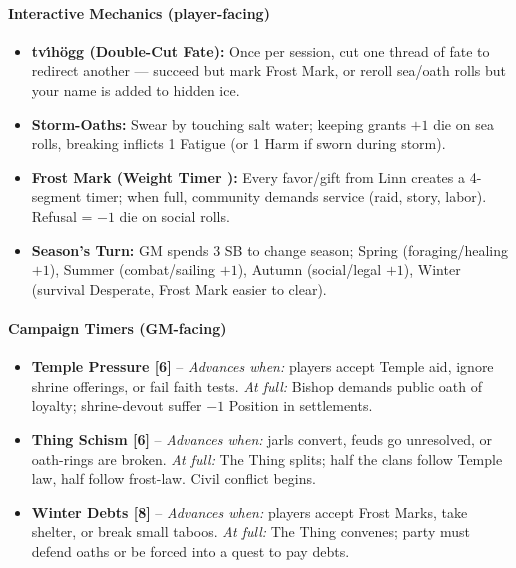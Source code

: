 \paragraph{Interactive Mechanics (player-facing)}
\begin{itemize}
\item[\card{\spadesuit}{1}] \textbf{tv\'{\i}h\"{o}gg (Double-Cut Fate):} Once per session, cut one thread of fate to redirect another --- succeed but mark Frost Mark, or reroll sea/oath rolls but your name is added to hidden ice.
\item[\card{\heartsuit}{2}] \textbf{Storm-Oaths:} Swear by touching salt water; keeping grants $+1$ die on sea rolls, breaking inflicts 1 Fatigue (or 1 Harm if sworn during storm).
\item[\card{\clubsuit}{3}] \textbf{Frost Mark (Weight Timer ):} Every favor/gift from Linn creates a 4-segment timer; when full, community demands service (raid, story, labor). Refusal = $-1$ die on social rolls.
\item[\card{\diamondsuit}{4}] \textbf{Season's Turn:} GM spends 3 SB to change season; Spring (foraging/healing $+1$), Summer (combat/sailing $+1$), Autumn (social/legal $+1$), Winter (survival Desperate, Frost Mark easier to clear).
\end{itemize}

\paragraph{Campaign Timers (GM-facing)}
\begin{itemize}
\item \textbf{Temple Pressure [6]} -- \textit{Advances when:} players accept Temple aid, ignore shrine offerings, or fail faith tests. \textit{At full:} Bishop demands public oath of loyalty; shrine-devout suffer $-1$ Position in settlements.
\item \textbf{Thing Schism [6]} -- \textit{Advances when:} jarls convert, feuds go unresolved, or oath-rings are broken. \textit{At full:} The Thing splits; half the clans follow Temple law, half follow frost-law. Civil conflict begins.
\item \textbf{Winter Debts [8]} -- \textit{Advances when:} players accept Frost Marks, take shelter, or break small taboos. \textit{At full:} The Thing convenes; party must defend oaths or be forced into a quest to pay debts.
\end{itemize}

